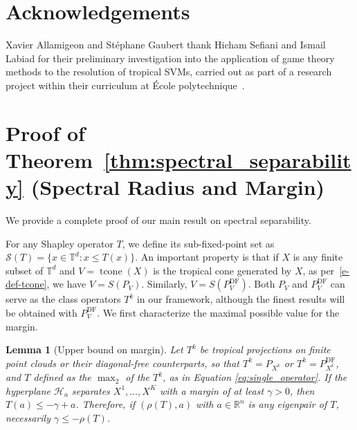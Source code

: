 \documentclass{article}
\newtheorem{lemma}[theorem]{Lemma}
\newcommand{\tcone}{\operatorname{tcone}}
\newcommand{\Pdiagfree}{P^{\text{DF}}}
\renewcommand{\leq}{\leqslant}
\newcommand{\R}{\mathbb{R}}
\newcommand{\trop}{\mathbb{T}}
\begin{document}
\section*{Acknowledgements}
Xavier Allamigeon and St\'ephane Gaubert thank Hicham Sefiani and Ismail Labiad
for their preliminary investigation into the application of game theory methods to the resolution of tropical SVMs, carried out as part of a research project within their curriculum at \'Ecole polytechnique~\cite{labiadsefiani}.





\newpage
\appendix
\section{Proof of Theorem~\ref{thm:spectral_separability} (Spectral Radius and Margin)}\label{appendix:proofs}
We provide a complete proof of our main result on spectral separability.

For any Shapley operator $T$, we define its sub-fixed-point
set as $\mathcal{S}(T) = \{x \in \trop^d : x \leq T(x)\}$.
An important property is that if $X$ is any finite subset of $\trop^d$
and $V=\tcone(X)$ is the tropical cone generated by $X$, as per~\eqref{e-def-tcone},
we have $V = S(P_V)$. Similarly, $V = S(P^{\text{DF}}_V)$.
Both $P_V$ and $\Pdiagfree_V$ 
can serve as the class operators $T^k$ in our framework,
although the finest results will be obtained with $\Pdiagfree_V$. 
We first characterize the maximal possible value for the margin.

\begin{lemma}[Upper bound on margin]\label{lemma:hyperplane_to_operator}
Let $T^k$ be tropical projections on finite point clouds or their diagonal-free counterparts, so that $T^k = P_{X^k}$ or $T^k=\Pdiagfree_{X^k}$, and $T$ defined as the $\operatorname{\max}_2$ of the $T^k$, as in Equation \ref{eq:single_operator}.
If the hyperplane $\mathcal{H}_a$ separates $X^1,\ldots,X^K$ with a margin of at least $\gamma > 0$, then $T(a) \leq -\gamma + a$.
Therefore, if $(\rho(T),a)$ with $a\in\R^n$ is any eigenpair of $T$, necessarily $\gamma \le -\rho(T)$.
\end{lemma}
\end{document}
